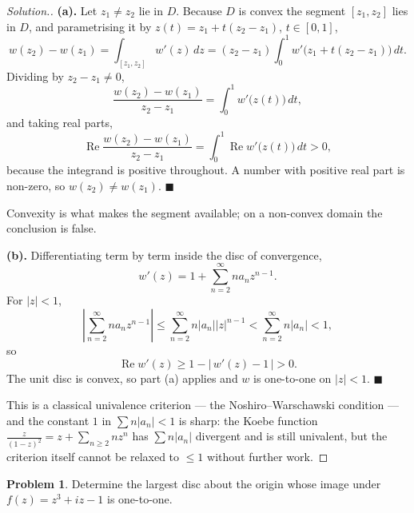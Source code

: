 \documentclass[11pt,a4paper]{article}
\theoremstyle{definition}
\newtheorem{problemx}{Problem}[section]
\newenvironment{problem}{\begin{problemx}}{\end{problemx}}
\newenvironment{solution}
  {\renewcommand{\qedsymbol}{}\begin{proof}[\textit{Solution}.]}
  {\end{proof}}
\begin{document}
\begin{solution}
\textbf{(a).} Let $z_1 \neq z_2$ lie in $D$. Because $D$ is convex the segment
$[z_1,z_2]$ lies in $D$, and parametrising it by
$z(t) = z_1 + t(z_2-z_1)$, $t \in [0,1]$,
$$w(z_2) - w(z_1) = \int_{[z_1,z_2]} w'(z)\,dz
= (z_2 - z_1)\int^{1}_{0} w'\big(z_1 + t(z_2-z_1)\big)\,dt .$$
Dividing by $z_2 - z_1 \neq 0$,
$$\frac{w(z_2)-w(z_1)}{z_2-z_1}
= \int^{1}_{0} w'\big(z(t)\big)\,dt,$$
and taking real parts,
$$\operatorname{Re}\frac{w(z_2)-w(z_1)}{z_2-z_1}
= \int^{1}_{0}\operatorname{Re}w'\big(z(t)\big)\,dt > 0,$$
because the integrand is positive throughout. A number with positive real part is
non-zero, so $w(z_2) \neq w(z_1)$. $\blacksquare$

Convexity is what makes the segment available; on a non-convex domain the
conclusion is false.

\textbf{(b).} Differentiating term by term inside the disc of convergence,
$$w'(z) = 1 + \sum^{\infty}_{n=2} n a_n z^{n-1}.$$
For $\left|z\right| < 1$,
$$\left|\sum^{\infty}_{n=2} n a_n z^{n-1}\right|
\leq \sum^{\infty}_{n=2} n\left|a_n\right|\left|z\right|^{n-1}
< \sum^{\infty}_{n=2} n\left|a_n\right| < 1 ,$$
so
$$\operatorname{Re}w'(z) \geq 1 - \left|\,w'(z) - 1\,\right| > 0 .$$
The unit disc is convex, so part (a) applies and $w$ is one-to-one on
$\left|z\right| < 1$. $\blacksquare$

This is a classical univalence criterion --- the Noshiro--Warschawski condition ---
and the constant $1$ in $\sum n\left|a_n\right| < 1$ is sharp: the Koebe function
$\frac{z}{(1-z)^2} = z + \sum_{n\geq2} n z^{n}$ has $\sum n\left|a_n\right|$
divergent and is still univalent, but the criterion itself cannot be relaxed to
$\leq 1$ without further work.
\end{solution}




\begin{problem}
Determine the largest disc about the origin whose image under
$f(z) = z^{3} + iz - 1$ is one-to-one.
\end{problem}
\end{document}
